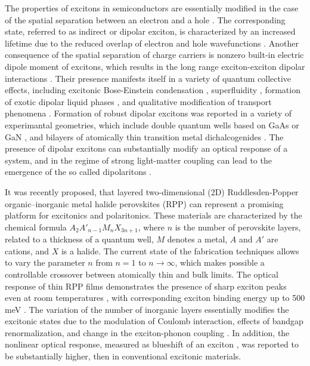 \documentclass[prb,twocolumn,preprintnumbers,superscriptaddress]{revtex4}
\begin{document}
The properties of excitons in semiconductors are essentially modified in the case of the spatial separation between an electron and a hole \cite{Lozovik1976}.
The corresponding state, referred to as indirect or dipolar exciton, is characterized by an increased lifetime due to the reduced overlap of electron and hole wavefunctions \cite{Butov2017}. 
Another consequence of the spatial separation of charge carriers is nonzero built-in electric dipole moment of excitons, which results in the long range exciton-exciton dipolar interactions \cite{Laikhtman2009,Kyriienko2012}.
Their presence manifests itself in a variety of quantum collective effects, including excitonic Bose-Einstein condensation \cite{Butov2002,High2012}, superfluidity \cite{Anakine2017}, formation of exotic dipolar liquid phases \cite{Misra2018,Hubert2019}, and qualitative modification of transport phenomena \cite{Ivanov2002,Winbow2011,Cohen2011,Fedichkin2015,Dorow2016,Shahnazaryan2021,Chiaruttini2021}.
Formation of robust dipolar excitons was reported in a variety of experimantal geometries, which include double quantum wells based on GaAs \cite{Butov1999} or GaN \cite{Fedichkin2015}, and bilayers of atomically thin transition metal dichalcogenides \cite{Fogler2014,Calman2018}.
The presence of dipolar excitons can substantially modify an optical response of a system, and in the regime of strong light-matter coupling can lead to the emergence of the so called dipolaritons \cite{Cristofolini2012,Rosenberg2018,Togan2018}. 

It was recently proposed, that layered two-dimensional (2D) Ruddlesden-Popper  organic–inorganic metal halide perovskites (RPP) \cite{Mitzi1994} can represent a  promising platform for excitonics and polaritonics. These materials are characterized by the chemical formula  ${A_2}{A'_{n - 1}}{M_n}{X_{3n + 1}}$, where $n$ is the number of perovskite layers, related to a thickness of a quantum well,  $M$ denotes a metal, $A$ and $A'$ are cations, and $X$ is a halide.
The current state of the fabrication techniques allows to vary the parameter $n$ from $n=1$ to $n\rightarrow\infty$, which makes possible a controllable crossover between atomically thin and bulk limits.
The optical response of thin RPP films demonstrates the presence of sharp exciton peaks even at room temperatures  \cite{Ahmad2015,Straus2018,Li2019,Marongiu2019,Deng2020}, 
with corresponding exciton binding energy up to 500 meV \cite{Tanaka2005,Yaffe2015,Mauck2019}.
The variation of the number of inorganic layers essentially modifies the excitonic states due to the modulation of Coulomb interaction,  effects of bandgap renormalization, and change in the exciton-phonon coupling \cite{Saparov2016,Gong2018,Straus2018,Blancon2018,Quan2019}.
In addition, the nonlinear optical response, measured as blueshift of an exciton \cite{Huang2017,Abdelwahab2019,Ohara2019}, was reported to be substantially higher, then in conventional excitonic materials.
\end{document}
